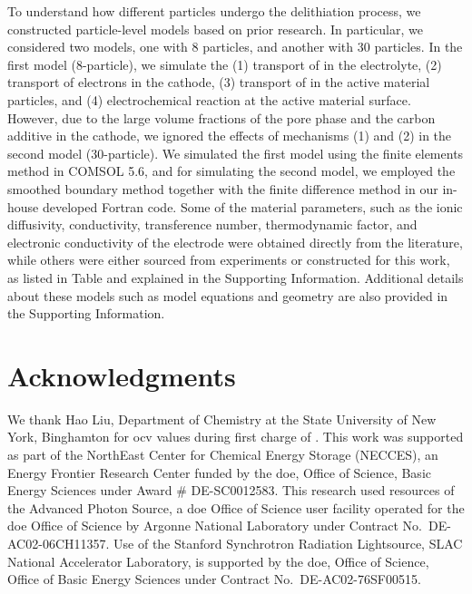 \documentclass{article}
\begin{document}

To understand how different particles undergo the delithiation
process, we constructed particle-level models based on prior
research\citeme{}. In particular, we considered two models, one with 8
particles, and another with 30 particles. In the first model
(8-particle), we simulate the (1) transport of  in the
electrolyte, (2) transport of electrons in the cathode, (3) transport
of  in the active material particles, and (4) electrochemical
reaction at the active material surface. However, due to the large
volume fractions of the pore phase and the carbon additive in the
cathode, we ignored the effects of mechanisms (1) and (2) in the
second model (30-particle). We simulated the first model using the
finite elements method in COMSOL 5.6, and for simulating the second
model, we employed the smoothed boundary method \cite{thornton2012}
together with the finite difference method in our in-house developed
Fortran code. Some of the material parameters, such as the ionic
diffusivity, conductivity, transference number, thermodynamic factor,
and electronic conductivity of the \nca{} electrode were obtained
directly from the literature\cite{lindbergh2008,lindbergh2008-2},
while others were either sourced from experiments or constructed for
this work, as listed in Table  and
explained in the Supporting Information. Additional details about
these models such as model equations and geometry are also provided in
the Supporting Information.


\section*{Acknowledgments}

We thank Hao Liu, Department of Chemistry at the State University of
New York, Binghamton for \gls{ocv} values during first charge of
\nca{}. This work was supported as part of the NorthEast Center for
Chemical Energy Storage (NECCES), an Energy Frontier Research Center
funded by the \gls{doe}, Office of Science, Basic Energy Sciences
under Award \# DE-SC0012583. This research used resources of the
Advanced Photon Source, a \gls{doe} Office of Science user facility
operated for the \gls{doe} Office of Science by Argonne National
Laboratory under Contract No.\ DE-AC02-06CH11357. Use of the Stanford
Synchrotron Radiation Lightsource, SLAC National Accelerator
Laboratory, is supported by the \gls{doe}, Office of Science, Office
of Basic Energy Sciences under Contract No.\ DE-AC02-76SF00515.
\end{document}
